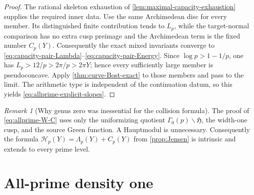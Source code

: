 \documentclass[11pt]{article}
\theoremstyle{definition}
\theoremstyle{remark}
\newtheorem{remark}[remark]{Remark}
\newcommand{\Energy}{\mathscr H}
\begin{document}
\begin{proof}
The rational skeleton exhaustion of
\cref{lem:maximal-capacity-exhaustion} supplies the required inner data.
Use the same Archimedean disc for every member.  Its distinguished finite
contribution tends to $L_p$, while the target-normal comparison has no extra
cusp preimage and the Archimedean term is the fixed number $C_p(Y)$.
Consequently the exact mixed invariants converge to
\eqref{eq:capacity-pair-Lambda}--\eqref{eq:capacity-pair-Energy}.  Since
$\log p>1-1/p$, one has
$L_p>12/p>2\pi/p>2\pi Y$; hence every sufficiently large member is
pseudoconcave.  Apply \cref{thm:curve-Bost-exact} to those members and pass
to the limit.  The arithmetic type is independent of the continuation datum,
so this yields \eqref{eq:allprime-explicit-slopes}.
\end{proof}

\begin{remark}[Why genus zero was inessential for the collision formula]
The proof of \eqref{eq:allprime-W-C} uses only the uniformizing quotient
$\Gamma_0(p)\backslash\mathfrak H$, the width-one cusp, and the source Green
function.  A Hauptmodul is unnecessary.  Consequently the formula
$\Energy_p(Y)=\Lambda_p(Y)+C_p(Y)$ from \cref{prop:Jensen} is intrinsic and
extends to every prime level.
\end{remark}

\section{All-prime density one}
\label{sec:allprime-density}
\end{document}
